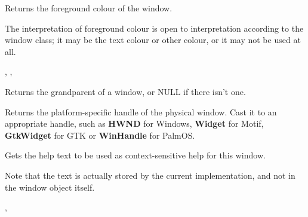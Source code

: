 

\label{wxwindowgetforegroundcolour}


Returns the foreground colour of the window.


The interpretation of foreground colour is open to interpretation according
to the window class; it may be the text colour or other colour, or it may not
be used at all.


,\rtfsp
{},\rtfsp
{}


\label{wxwindowgetgrandparent}


Returns the grandparent of a window, or NULL if there isn't one.


\label{wxwindowgethandle}


Returns the platform-specific handle of the physical window. Cast it to an appropriate
handle, such as {\bf HWND} for Windows, {\bf Widget} for Motif, {\bf GtkWidget} for GTK or {\bf WinHandle} for PalmOS.




\label{wxwindowgethelptext}


Gets the help text to be used as context-sensitive help for this window.

Note that the text is actually stored by the current  implementation,
and not in the window object itself.


, 


